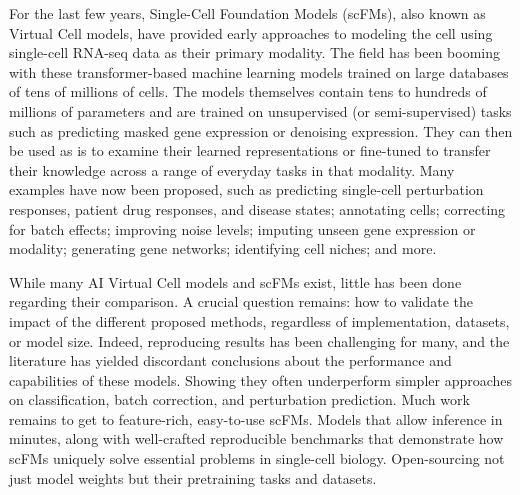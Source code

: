 For the last few years, Single-Cell Foundation Models (\gls{scFM}s), also
known as Virtual Cell models, have provided early approaches to modeling
the cell using single-cell RNA-seq data as their primary
modality\citep{cuiScGPTBuildingFoundation2024,theodorisTransferLearningEnables2023,yangScBERTLargescalePretrained2022a,rosenUniversalCellEmbeddings2023}. The field has been booming with these
transformer-based machine learning models trained on large databases of
tens of millions of cells. The models themselves contain tens to
hundreds of millions of parameters and are trained on unsupervised (or
semi-supervised) tasks such as predicting masked gene expression or
denoising expression. They can then be used as is to examine their
learned representations or fine-tuned to transfer their knowledge across
a range of everyday tasks in that modality. Many examples have now been
proposed, such as predicting single-cell perturbation responses, patient
drug responses, and disease states; annotating cells; correcting for
batch effects; improving noise levels; imputing unseen gene expression
or modality; generating gene networks; identifying cell niches; and
more\citep{xiongScCLIPMultimodalSinglecell2023,zhaoLangCellLanguagecellPretraining2024,yangScBERTLargescalePretrained2022a,dedonnoPopulationlevelIntegrationSinglecell2023,yangGeneCompassDecipheringUniversal2023,baiScLongBillionParameter2024,zengCellFMLargescaleFoundation2025,tejadaLapuertaNicheformerFoundationModel2025,pearceTranscriptFormerCrossSpeciesGenerative2025,dingPrivacypreservingPredictiveFoundation2025,fuFoundationModelTranscription2025}.

While many AI Virtual Cell models and \gls{scFM}s exist, little has been done
regarding their comparison\citep{deeperEvaluationSinglecellFoundation2024,liuEvaluatingUtilitiesFoundation2024,reusabilityReportExploringSpatial2025,crowleyBenchmarkingCellTypeGene2025,delineatingEffectiveUseSelfSupervisedLearning2024}. A crucial question
remains: how to validate the impact of the different proposed methods,
regardless of implementation, datasets, or model size. Indeed,
reproducing results has been challenging for many, and the literature
has yielded discordant conclusions about the performance and
capabilities of these models. Showing they often underperform simpler
approaches on classification, batch correction, and perturbation
prediction\citep{deeperEvaluationSinglecellFoundation2024,liuEvaluatingUtilitiesFoundation2024,nourisaGeneRNIBLivingBenchmark2025,bendidiBenchmarkingTranscriptomicsFoundation2024,attiFullArticleFundamental2025}. Much work remains to get to
feature-rich, easy-to-use \gls{scFM}s. Models that allow inference in minutes,
along with well-crafted reproducible benchmarks that demonstrate how
\gls{scFM}s uniquely solve essential problems in single-cell biology.
Open-sourcing not just model weights but their pretraining tasks and
datasets.\textbf{\hfill\break
}

